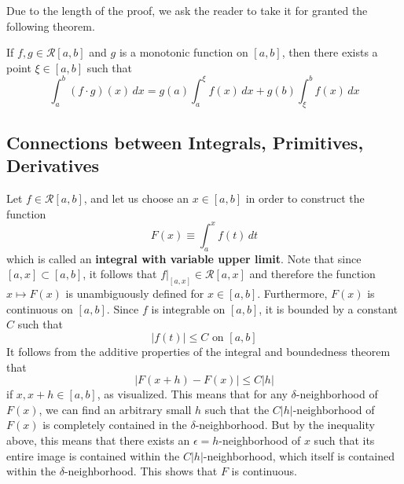   Due to the length of the proof, we ask the reader to take it for granted the following theorem. 

  \begin{theorem}
  If $f, g \in \mathcal{R}[a, b]$ and $g$ is a monotonic function on $[a, b]$, then there exists a point $\xi \in [a, b]$ such that
  \[\int_a^b (f \cdot g) (x)\,dx = g(a) \int_a^\xi f(x)\,dx + g(b) \int_\xi^b f(x)\,dx\]
  \end{theorem}

\subsection{Connections between Integrals, Primitives, Derivatives}

  \begin{definition}
    Let $f \in \mathcal{R}[a, b]$, and let us choose an $x \in [a, b]$ in order to construct the function
    \[F(x) \equiv \int_a^x f(t)\,dt\]
    which is called an \textbf{integral with variable upper limit}. Note that since $[a, x] \subset [a, b]$, it follows that $f \big|_{[a,x]} \in \mathcal{R}[a, x]$ and therefore the function $x \mapsto F(x)$ is unambiguously defined for $x \in [a, b]$. Furthermore, $F(x)$ is continuous on $[a, b]$. Since $f$ is integrable on $[a, b]$, it is bounded by a constant $C$ such that
    \[|f(t)| \leq C \text{ on } [a, b]\]
    It follows from the additive properties of the integral and boundedness theorem that 
    \[|F(x + h) - F(x)| \leq C|h|\]
    if $x, x + h \in [a, b]$, as visualized. This means that for any $\delta$-neighborhood of $F(x)$, we can find an arbitrary small $h$ such that the $C|h|$-neighborhood of $F(x)$ is completely contained in the $\delta$-neighborhood. But by the inequality above, this means that there exists an $\epsilon = h$-neighborhood of $x$ such that its entire image is contained within the $C|h|$-neighborhood, which itself is contained within the $\delta$-neighborhood. This shows that $F$ is continuous. 
  \end{definition}

